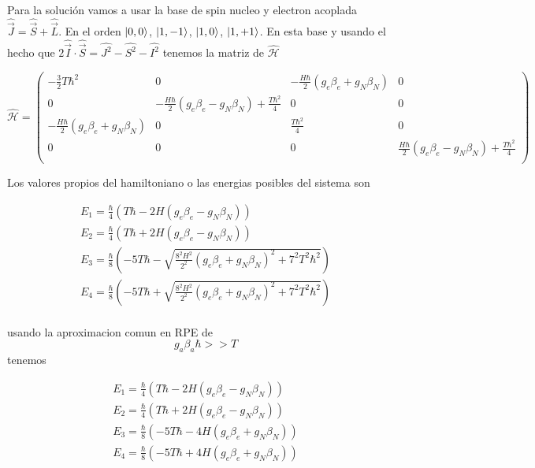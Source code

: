 \documentclass[%
amssymb,prb,aps,superscriptaddress]{revtex4}
\begin{document}
Para la solución vamos a usar la base de spin nucleo y electron acoplada $\hat{\vec{J}} = \hat{\vec{S}} + \hat{\vec{L}}$. En el orden $\ket{0,0}$, $\ket{1,-1}$, $\ket{1,0}$, $\ket{1,+1}$. En esta base y usando el hecho que $ 2 \hat{\vec{I}} \cdot \hat{\vec{S}} = \hat{J^2} - \hat{S^2} - \hat{I^2} $ tenemos la matriz de $\mathcal{\hat{H}}$

$$
\hat{\mathcal{H}} =     
\begin{pmatrix}

    -\frac{3}{2} T \hbar^2 & 0 & - \frac{H \hbar}{2} (g_e \beta_e + g_N \beta_N) & 0 \\

    0 & -\frac{H \hbar}{2} (g_e \beta_e - g_N \beta_N) + \frac{T \hbar^2}{4} & 0 & 0 \\

    - \frac{H \hbar}{2} (g_e \beta_e + g_N \beta_N) & 0 & \frac{T \hbar^2}{4} & 0 \\

    0 & 0 & 0 & \frac{H \hbar}{2} (g_e \beta_e - g_N \beta_N) + \frac{T \hbar^2}{4} \\

\end{pmatrix}
$$

Los valores propios del hamiltoniano o las energias posibles del sistema son

    \begin{align*}
        E_1 = \frac{\hbar}{4}(T \hbar - 2 H (g_e \beta_e - g_N \beta_N)) \\
        E_2 = \frac{\hbar}{4}(T \hbar + 2 H (g_e \beta_e - g_N \beta_N)) \\
        E_3 = \frac{\hbar}{8}\left(-5 T \hbar - \sqrt{\frac{8^2 H^2}{2^2} (g_e \beta_e + g_N \beta_N)^2 + 7^2 T^2 \hbar^2}\right) \\
        E_4 = \frac{\hbar}{8}\left(-5 T \hbar + \sqrt{\frac{8^2 H^2}{2^2} (g_e \beta_e + g_N \beta_N)^2 + 7^2 T^2 \hbar^2} \right) \\
    \end{align*}

usando la aproximacion comun en RPE de $$ g_a \beta_a \hbar >> T  $$
tenemos

    \begin{align*}
        E_1 = \frac{\hbar}{4}(T \hbar - 2 H (g_e \beta_e - g_N \beta_N)) \\
        E_2 = \frac{\hbar}{4}(T \hbar + 2 H (g_e \beta_e - g_N \beta_N)) \\
        E_3 = \frac{\hbar}{8}\left(-5 T \hbar - 4 H (g_e \beta_e + g_N \beta_N)\right) \\
        E_4 = \frac{\hbar}{8}\left(-5 T \hbar + {4 H} (g_e \beta_e + g_N \beta_N)\right) \\
    \end{align*}
\end{document}
